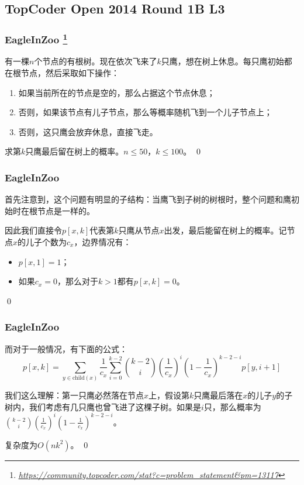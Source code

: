 \documentclass[9pt,dvipsnames,table]{beamer}
\newcommand{\hlink}[1]{
	\footnote{\fontsize{6pt}{\baselineskip}\href{#1}{\textsl{\underline{\url{#1}}}}}
}
\newenvironment{qedframe}{%
	\begin{frame}[environment=qedqedframe]%
	}{%
	\qed
	\end{frame}%
}
\begin{document}
\subsection{TopCoder Open 2014 Round 1B L3}
\begin{qedframe}
	\frametitle{EagleInZoo\hlink{https://community.topcoder.com/stat?c=problem_statement&pm=13117}}
	有一棵$n$个节点的有根树。现在依次飞来了$k$只鹰，想在树上休息。每只鹰初始都在根节点，然后采取如下操作：
	\begin{enumerate}
		\item 如果当前所在的节点是空的，那么占据这个节点休息；
		\item 否则，如果该节点有儿子节点，那么等概率随机飞到一个儿子节点上；
		\item 否则，这只鹰会放弃休息，直接飞走。
	\end{enumerate}
	
	求第$k$只鹰最后留在树上的概率。$n\leq 50$，$k\leq 100$。
\end{qedframe}
\begin{qedframe}
	\frametitle{EagleInZoo}
	首先注意到，这个问题有明显的子结构：当鹰飞到子树的树根时，整个问题和鹰初始时在根节点是一样的。\pause
	
	因此我们直接令$p[x,k]$代表第$k$只鹰从节点$x$出发，最后能留在树上的概率。记节点$x$的儿子个数为$c_x$，边界情况有：
	\begin{itemize}
		\item $p[x,1]=1$；
		\item 如果$c_x=0$，那么对于$k>1$都有$p[x,k]=0$。
	\end{itemize}
\end{qedframe}
\begin{qedframe}
	\frametitle{EagleInZoo}
	而对于一般情况，有下面的公式：
	\[ p[x,k] = \sum_{y\in\mathrm{child}(x)}\frac{1}{c_x}\sum_{i=0}^{k-2}\binom{k-2}{i}\left(\frac{1}{c_x}\right)^i\left(1-\frac{1}{c_x}\right)^{k-2-i}p[y,i+1] \]
	
	我们这么理解：第一只鹰必然落在节点$x$上，假设第$k$只鹰最后落在$x$的儿子$y$的子树内，我们考虑有几只鹰也曾飞进了这棵子树。如果是$i$只，那么概率为$\binom{k-2}{i}\left(\frac{1}{c_x}\right)^i\left(1-\frac{1}{c_x}\right)^{k-2-i}$。
	
	复杂度为$O(nk^2)$。
\end{qedframe}
\end{document}
